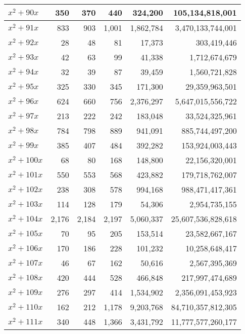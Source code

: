 \documentclass[a4paper]{amsproc}
\theoremstyle{plain}
\begin{document}
\begin{longtable}{ | l | r | r | r | r | r | }
$x^2 + 90x$ & 350 & 370 & 440 & 324{,}200 & 105{,}134{,}818{,}001 \\ \hline
$x^2 + 91x$ & 833 & 903 & 1{,}001 & 1{,}862{,}784 & 3{,}470{,}133{,}744{,}001 \\ \hline
$x^2 + 92x$ & 28 & 48 & 81 & 17{,}373 & 303{,}419{,}446 \\ \hline
$x^2 + 93x$ & 42 & 63 & 99 & 41{,}338 & 1{,}712{,}674{,}679 \\ \hline
$x^2 + 94x$ & 32 & 39 & 87 & 39{,}459 & 1{,}560{,}721{,}828 \\ \hline
$x^2 + 95x$ & 325 & 330 & 345 & 171{,}300 & 29{,}359{,}963{,}501 \\ \hline
$x^2 + 96x$ & 624 & 660 & 756 & 2{,}376{,}297 & 5{,}647{,}015{,}556{,}722 \\ \hline
$x^2 + 97x$ & 213 & 222 & 242 & 183{,}048 & 33{,}524{,}325{,}961 \\ \hline
$x^2 + 98x$ & 784 & 798 & 889 & 941{,}091 & 885{,}744{,}497{,}200 \\ \hline
$x^2 + 99x$ & 385 & 407 & 484 & 392{,}282 & 153{,}924{,}003{,}443 \\ \hline
$x^2 + 100x$ & 68 & 80 & 168 & 148{,}800 & 22{,}156{,}320{,}001 \\ \hline
$x^2 + 101x$ & 550 & 553 & 568 & 423{,}882 & 179{,}718{,}762{,}007 \\ \hline
$x^2 + 102x$ & 238 & 308 & 578 & 994{,}168 & 988{,}471{,}417{,}361 \\ \hline
$x^2 + 103x$ & 114 & 128 & 179 & 54{,}306 & 2{,}954{,}735{,}155 \\ \hline
$x^2 + 104x$ & 2{,}176 & 2{,}184 & 2{,}197 & 5{,}060{,}337 & 25{,}607{,}536{,}828{,}618 \\ \hline
$x^2 + 105x$ & 70 & 95 & 205 & 153{,}514 & 23{,}582{,}667{,}167 \\ \hline
$x^2 + 106x$ & 170 & 186 & 228 & 101{,}232 & 10{,}258{,}648{,}417 \\ \hline
$x^2 + 107x$ & 46 & 67 & 162 & 50{,}616 & 2{,}567{,}395{,}369 \\ \hline
$x^2 + 108x$ & 420 & 444 & 528 & 466{,}848 & 217{,}997{,}474{,}689 \\ \hline
$x^2 + 109x$ & 276 & 297 & 414 & 1{,}534{,}902 & 2{,}356{,}091{,}453{,}923 \\ \hline
$x^2 + 110x$ & 162 & 212 & 1{,}178 & 9{,}203{,}768 & 84{,}710{,}357{,}812{,}305 \\ \hline
$x^2 + 111x$ & 340 & 448 & 1{,}366 & 3{,}431{,}792 & 11{,}777{,}577{,}260{,}177 \\ \hline

\end{longtable}
\end{document}
